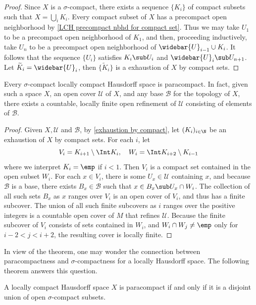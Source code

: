 \begin{proof}
Since $X$ is a $\sigma$-compact, there exists a sequence $\{K_i\}$ of compact subsets such that $X=\bigcup_iK_i$. Every compact subset of $X$ has a precompact open neighborhood by \cref{LCH precompact nbhd for compact set}. Thus we may take $U_1$ to be a precompact open neighborhood of $K_1$, and then, proceeding inductively, take $U_n$ to be a precompact open neighborhood of $\widebar{U}_{i-1}\cup K_i$. It follows that the sequence $\{U_i\}$ satisfies $K_i\sub U_i$ and $\widebar{U}_{i}\sub U_{n+1}$. Let $\widetilde{K}_i=\widebar{U}_i$, then $\{\widetilde{K}_i\}$ is a exhaustion of $X$ by compact sets. 
\end{proof}
\begin{theorem}\label{loc compact paracompact}
Every $\sigma$-compact locally compact Hausdorff space is paracompact. In fact, given such a space $X$, an open cover $\mathcal{U}$ of $X$, and any base $\mathcal{B}$ for the topology of $X$, there exists a countable, locally finite open refinement of $\mathcal{U}$ consisting of elements of $\mathcal{B}$.
\end{theorem}
\begin{proof}
Given $X,\mathcal{U}$ and $\mathcal{B}$, by \cref{exhaustion by compact}, let $(K_i)_{i\in\N}$ be an exhaustion of $X$ by compact sets. For each $i$, let
\[V_i=K_{i+1}\setminus\Int K_i,\quad W_i=\Int K_{i+2}\setminus K_{i-1}\]
where we interpret $K_i=\emp$ if $i<1$. Then $V_i$ is a compact set contained in the open subset $W_i$. For each $x\in V_i$, there is some $U_x\in\mathcal{U}$ containing $x$, and because $\mathcal{B}$ is a base, there exists $B_x\in\mathcal{B}$ such that $x\in B_x\sub U_x\cap W_i$. The collection of all such sets $B_x$ as $x$ ranges over $V_i$ is an open cover of $V_i$, and thus has a finite subcover. The union of all such finite subcovers as $i$ ranges over the positive integers is a countable open cover of $M$ that refines $\mathcal{U}$. Because the finite subcover of $V_i$ consists of sets contained in $W_i$, and $W_i\cap W_{j}\neq \emp$ only for $i-2<j<i+2$, the resulting cover is locally finite.
\end{proof}
In view of the theorem, one may wonder the connection between paracompactness and $\sigma$-compactness for a locally Hausdorff space. The following theorem answers this question.
\begin{theorem}\label{LCH paracompact iff sigma-compact}
A locally compact Hausdorff space $X$ is paracompact if and only if it is a disjoint union of open $\sigma$-compact subsets.
\end{theorem}

